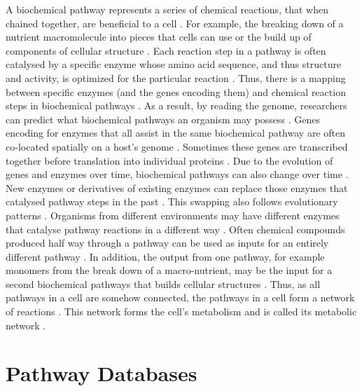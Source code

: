 A biochemical pathway represents a series of chemical reactions, that when chained together, are beneficial to a cell \cite{michal2012biochemical}. For example, the breaking down of a nutrient macromolecule into pieces that cells can use or the build up of components of cellular structure \cite{wagner2012metabolic}. Each reaction step in a pathway is often \cite{keller2015widespread,tawfik2010enzyme} catalysed by a specific enzyme whose amino acid sequence, and thus structure and activity, is optimized for the particular reaction \cite{michal2012biochemical,zhang2003evolution,fersht1999structure}. Thus, there is a mapping between specific enzymes (and the genes encoding them) and chemical reaction steps in biochemical pathways \cite{thiele2010protocol}. As a result, by reading the genome, researchers can predict what biochemical pathways an organism may possess \cite{abubucker2012metabolic,thiele2010protocol}. Genes encoding for enzymes that all assist in the same biochemical pathway are often co-located spatially on a host's genome \cite{lawrence1999selfish,de2010genomic}. Sometimes these genes are transcribed together before translation into individual proteins \cite{blumenthal1998gene,danchin1980coordinate}. Due to the evolution of genes and enzymes over time, biochemical pathways can also change over time \cite{hochachka2002biochemical,raymond2006effect}. New enzymes or derivatives of existing enzymes can replace those enzymes that catalysed pathway steps in the past \cite{jensen1976enzyme}. This swapping also follows evolutionary patterns \cite{morowitz1999theory, raymond2006effect,wagner2012metabolic}. Organisms from different environments may have different enzymes that catalyse pathway reactions in a different way \cite{raymond2006effect}. Often chemical compounds produced half way through a pathway can be used as inputs for an entirely different pathway \cite{wagner2012metabolic,stelling2002metabolic}. In addition, the output from one pathway, for example monomers from the break down of a macro-nutrient, may be the input for a second biochemical pathways that builds cellular structures \cite{wagner2012metabolic,stelling2002metabolic}. Thus, as all pathways in a cell are somehow connected, the pathways in a cell form a network of reactions \cite{wagner2012metabolic,stelling2002metabolic}. This network forms the cell's metabolism and is called its metabolic network \cite{wagner2012metabolic}.

\section{Pathway Databases}

